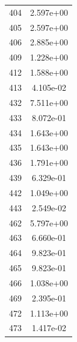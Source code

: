 \documentclass[12pt]{article}
\begin{document}
\begin{longtable}{@{}cc@{}}
404 & 2.597e+00 \\
405 & 2.597e+00 \\
406 & 2.885e+00 \\
409 & 1.228e+00 \\
412 & 1.588e+00 \\
413 & 4.105e-02 \\
432 & 7.511e+00 \\
433 & 8.072e-01 \\
434 & 1.643e+00 \\
435 & 1.643e+00 \\
436 & 1.791e+00 \\
439 & 6.329e-01 \\
442 & 1.049e+00 \\
443 & 2.549e-02 \\
462 & 5.797e+00 \\
463 & 6.660e-01 \\
464 & 9.823e-01 \\
465 & 9.823e-01 \\
466 & 1.038e+00 \\
469 & 2.395e-01 \\
472 & 1.113e+00 \\
473 & 1.417e-02 \\

\bottomrule
\end{longtable}
\end{document}

